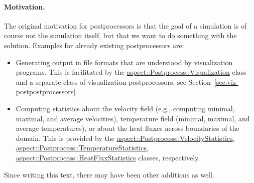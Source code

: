 \documentclass{article}
\begin{document}
\paragraph{Motivation.}
The original motivation for postprocessors is that the goal of a simulation is
of course not the simulation itself, but that we want to do something with the
solution. Examples for already existing postprocessors are:
\begin{itemize}
\item Generating output in file formats that are understood by visualization
  programs. This is facilitated by the
  \href{doc/doxygen/classaspect_1_1Postprocess_1_1Visualization.html}{aspect::Postprocess::Visualization}
  class and a separate class of visualization postprocessors, see
  Section~\ref{sec:viz-postpostprocessors}.
\item Computing statistics about the velocity field (e.g., computing minimal,
  maximal, and average velocities), temperature field (minimal, maximal, and
  average temperatures), or about the heat fluxes across boundaries of the
  domain. This is provided by the
  \href{doc/doxygen/classaspect_1_1Postprocess_1_1VelocityStatistics.html}{aspect::Postprocess::VelocityStatistics},
  \href{doc/doxygen/classaspect_1_1Postprocess_1_1TemperatureStatistics.html}{aspect::Postprocess::TemperatureStatistics},
  \href{doc/doxygen/classaspect_1_1Postprocess_1_1HeatFluxStatistics.html}{aspect::Postprocess::HeatFluxStatistics}
  classes, respectively.
\end{itemize}
Since writing this text, there may have been other additions as well.
\end{document}
